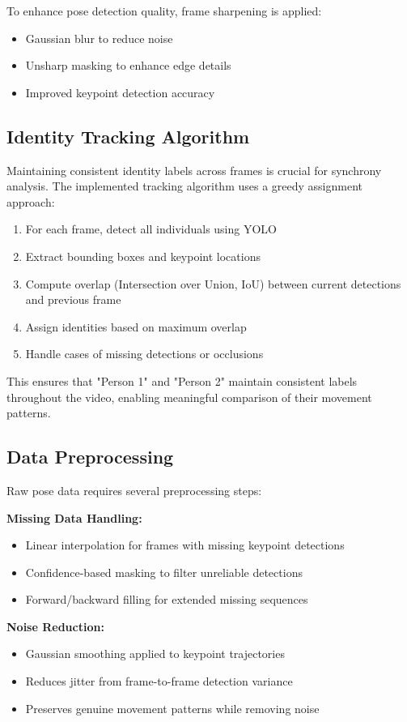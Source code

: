 \documentclass[11pt]{article}
\begin{document}
To enhance pose detection quality, frame sharpening is applied:
\begin{itemize}
    \item Gaussian blur to reduce noise
    \item Unsharp masking to enhance edge details
    \item Improved keypoint detection accuracy
\end{itemize}

\subsection{Identity Tracking Algorithm}
Maintaining consistent identity labels across frames is crucial for synchrony analysis. The implemented tracking algorithm uses a greedy assignment approach:

\begin{enumerate}
    \item For each frame, detect all individuals using YOLO
    \item Extract bounding boxes and keypoint locations
    \item Compute overlap (Intersection over Union, IoU) between current detections and previous frame
    \item Assign identities based on maximum overlap
    \item Handle cases of missing detections or occlusions
\end{enumerate}

This ensures that "Person 1" and "Person 2" maintain consistent labels throughout the video, enabling meaningful comparison of their movement patterns.

\subsection{Data Preprocessing}
Raw pose data requires several preprocessing steps:

\textbf{Missing Data Handling:}
\begin{itemize}
    \item Linear interpolation for frames with missing keypoint detections
    \item Confidence-based masking to filter unreliable detections
    \item Forward/backward filling for extended missing sequences
\end{itemize}

\textbf{Noise Reduction:}
\begin{itemize}
    \item Gaussian smoothing applied to keypoint trajectories
    \item Reduces jitter from frame-to-frame detection variance
    \item Preserves genuine movement patterns while removing noise
\end{itemize}
\end{document}
